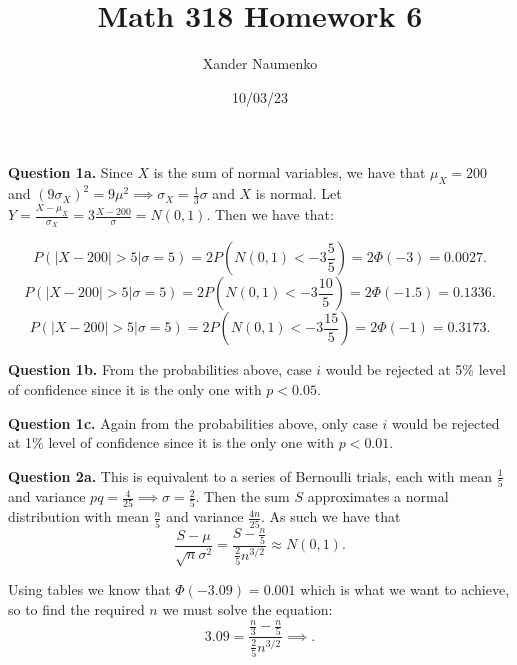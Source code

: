 \documentclass[letterpaper, reqno,11pt]{article}
\begin{document}
\title{Math 318 Homework 6}
\date{10/03/23}
\author{Xander Naumenko}
\maketitle

{\medskip\noindent\bf Question 1a.} Since $X$ is the sum of normal variables, we have that $\mu_X=200$ and $(9\sigma_X)^2=9\mu ^2\implies\sigma_X=\frac{1}{3}\sigma$ and $X$ is normal. Let $Y=\frac{X-\mu_X}{\sigma_X}=3 \frac{X-200}{\sigma}=N(0, 1)$. Then we have that: 

\[
P(|X-200| >5|\sigma=5)=2P(N(0, 1)<-3 \frac{5}{5})=2\Phi(-3)=0.0027
.\]
\[
P(|X-200| >5|\sigma=5)=2P(N(0, 1)<-3 \frac{10}{5})=2\Phi(-1.5)=0.1336
.\]
\[
P(|X-200| >5|\sigma=5)=2P(N(0, 1)<-3 \frac{15}{5})=2\Phi(-1)=0.3173
.\]

{\medskip\noindent\bf Question 1b.} From the probabilities above, case $i$ would be rejected at 5\% level of confidence since it is the only one with $p<0.05$. 

{\medskip\noindent\bf Question 1c.} Again from the probabilities above, only case $i$ would be rejected at 1\% level of confidence since it is the only one with $p<0.01$. 

{\medskip\noindent\bf Question 2a.} This is equivalent to a series of Bernoulli trials, each with mean $\frac{1}{5}$ and variance $pq=\frac{4}{25}\implies\sigma = \frac{2}{5}$. Then the sum $S$ approximates a normal distribution with mean $\frac{n}{5}$ and variance $\frac{4n}{25}$. As such we have that 
\[
\frac{S-\mu}{\sqrt{n} \sigma^2}=\frac{S-\frac{n}{5}}{\frac{2}{5}n^{3 /2}}\approx N(0, 1)
.\]

Using tables we know that $\Phi(-3.09)=0.001$ which is what we want to achieve, so to find the required $n$ we must solve the equation: 
\[
3.09=\frac{\frac{n}{3}-\frac{n}{5}}{\frac{2}{5}n^{3 /2}}\implies
.\]
\end{document}
